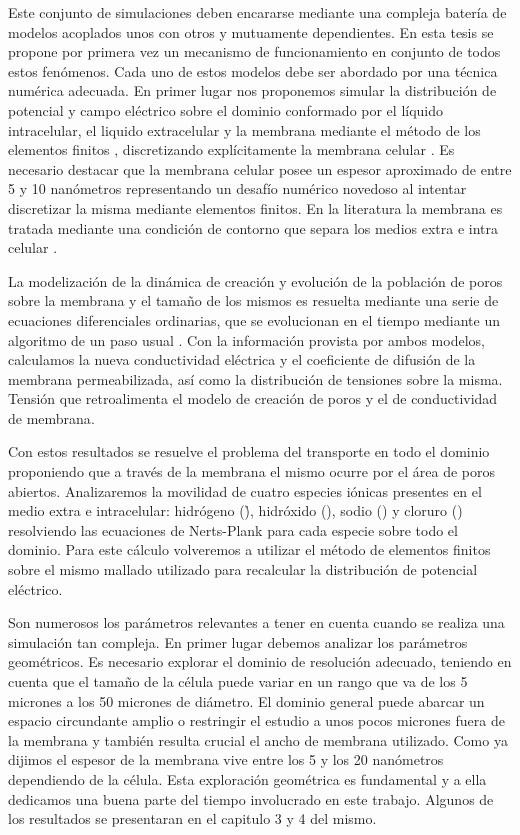 Este conjunto de simulaciones deben encararse mediante una compleja batería de modelos acoplados unos con otros y mutuamente dependientes. En esta tesis se propone por primera vez un mecanismo de funcionamiento en conjunto de todos estos fenómenos. Cada uno de estos modelos debe ser abordado por una técnica numérica adecuada. En primer lugar nos proponemos simular la distribución de potencial y campo eléctrico sobre el dominio conformado por el líquido intracelular, el liquido extracelular y la membrana mediante el método de los elementos finitos \cite{c9-fem-electro, zien}, discretizando explícitamente la membrana celular \cite{c8}. Es necesario destacar que la membrana celular posee un espesor aproximado de entre 5 y 10 nanómetros representando un desafío numérico novedoso al intentar discretizar la misma mediante elementos finitos. En la literatura la membrana es tratada mediante una condición de contorno que separa los medios extra e intra celular \cite{c12}.

La modelización de la dinámica de creación y evolución de la población de poros sobre la membrana y el tamaño de los mismos es resuelta mediante una serie de ecuaciones diferenciales ordinarias, que se evolucionan en el tiempo mediante un algoritmo de un paso usual \cite{c15}. Con la información provista por ambos modelos, calculamos la nueva conductividad eléctrica y el coeficiente de difusión de la membrana permeabilizada, así como la distribución de tensiones sobre la misma. Tensión que retroalimenta el modelo de creación de poros y el de conductividad de membrana\cite{c13}.

Con estos resultados se resuelve el problema del transporte en todo el dominio proponiendo que a través de la membrana el mismo ocurre por el área de poros abiertos. Analizaremos la movilidad de cuatro especies iónicas presentes en el medio extra e intracelular: hidrógeno (\h), hidróxido (\oh), sodio (\na) y cloruro (\cl) resolviendo las ecuaciones de Nerts-Plank para cada especie sobre todo el dominio. Para este cálculo volveremos a utilizar el método de elementos finitos sobre el mismo mallado utilizado para recalcular la distribución de potencial eléctrico.

Son numerosos los parámetros relevantes a tener en cuenta cuando se realiza una simulación tan compleja. En primer lugar debemos analizar los parámetros geométricos. Es necesario explorar el dominio de resolución adecuado, teniendo en cuenta que el tamaño de la célula puede variar en un rango que va de los 5 micrones a los 50 micrones de diámetro. El dominio general puede abarcar un espacio circundante amplio o restringir el estudio a unos pocos micrones fuera de la membrana y también resulta crucial el ancho de membrana utilizado. Como ya dijimos el espesor de la membrana vive entre los 5 y los 20 nanómetros dependiendo de la célula. Esta exploración geométrica es fundamental y a ella dedicamos una buena parte del tiempo involucrado en este trabajo. Algunos de los resultados se presentaran en el capitulo 3 y 4 del mismo. 

